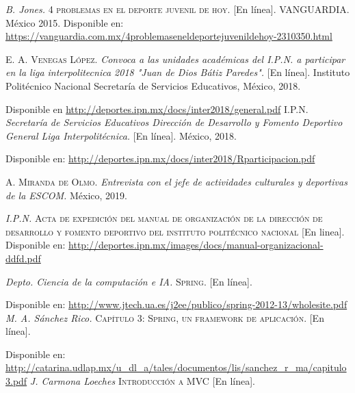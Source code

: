 \begin{thebibliography}{}
	\textit{B. Jones.}
	\textsc{4 problemas en el deporte juvenil de hoy.} [En línea].
	VANGUARDIA. México 2015.
	Disponible en: 
	\url{https://vanguardia.com.mx/4problemaseneldeportejuvenildehoy-2310350.html}
	
	\textsc{E. A. Venegas López.}
	\textit{Convoca a las unidades académicas del I.P.N. a participar en la liga interpolitecnica 2018 "Juan de Dios Bátiz Paredes".} [En línea]. Instituto Politécnico Nacional Secretaría de Servicios Educativos, México, 2018.
	
	Disponible en
	\url{http://deportes.ipn.mx/docs/inter2018/general.pdf}
	\textsc{I.P.N.}
	\textit{Secretaría de Servicios Educativos Dirección de Desarrollo y Fomento Deportivo General Liga Interpolitécnica.}
	[En línea]. México, 2018.
	
	Disponible en: 
	\url{http://deportes.ipn.mx/docs/inter2018/Rparticipacion.pdf}
	
	\textsc{A. Miranda de Olmo.}
	\textit{Entrevista con el jefe de actividades culturales y deportivas de la ESCOM.} México, 2019.
	
	
	\textit{I.P.N.}
	\textsc{Acta de expedición del manual de organización de la dirección de desarrollo y fomento deportivo del instituto politécnico nacional} [En linea].
	Disponible en:
	\url{http://deportes.ipn.mx/images/docs/manual-organizacional-ddfd.pdf}
	
	\textit{Depto. Ciencia de la computación e IA.}
	\textsc{Spring.} [En línea]. 
	
	Disponible en:
	\url{http://www.jtech.ua.es/j2ee/publico/spring-2012-13/wholesite.pdf}
	\textit{M. A. Sánchez Rico.}
	\textsc{Capítulo 3: Spring, un framework de aplicación.} [En línea].
	
	Disponible en:
	\url{http://catarina.udlap.mx/u_dl_a/tales/documentos/lis/sanchez_r_ma/capitulo3.pdf}
	\textit{J. Carmona Loeches}
	\textsc{Introducción a MVC} [En línea]. 
	

\end{thebibliography}
